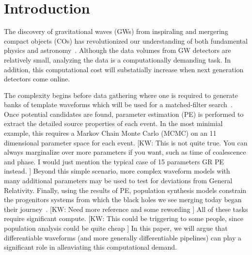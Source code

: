 \documentclass[twocolumn]{aastex631}
\newcommand{\kw}[1]{{\color{rb4}[KW: #1 ]}}
\begin{document}
\section{Introduction}
\label{sec:intro}


The discovery of gravitational waves (GWs) from inspiraling and mergering compact objects (COs) has revolutionized our understanding of both fundamental physics and astronomy~\citep{LIGOScientific:2021djp}.
Although the data volumes from GW detectors are relatively small, analyzing the data is a computationally demanding task.
In addition, this computational cost will substatially increase when next generation detectors come online.

The complexity begins before data gathering where one is required to generate banks of template waveforms which will be used for a matched-filter search~\citep{Owen:1998dk, Owen:1995tm}. 
Once potential candidates are found, parameter estimation (PE) is performed to extract the detailed source properties of each event.
In the most minimial example, this requires a Markov Chain Monte Carlo (MCMC) on an 11 dimensional parameter space for each event. \kw{This is not quite true. You can always marginalize over more parameters if you want, such as time of coalescence and phase. I would just mention the typical case of 15 parameters GR PE instead.}
Beyond this simple scenario, more complex waveform models with many additional parameters may be used to test for deviations from General Relativity.
Finally, using the results of PE, population synthesis models constrain the progenitors systems from which the black holes we see merging today began their journey~\citep{Wong:2022flg}. \kw{Need more reference and some rewording}
All of these tasks require significant compute. \kw{This could be triggering to some people, since population analysis could be quite cheap}
In this paper, we will argue that differentiable waveforms (and more generally differentiable pipelines) can play a significant role in alleaviating this computational demand.
\end{document}
